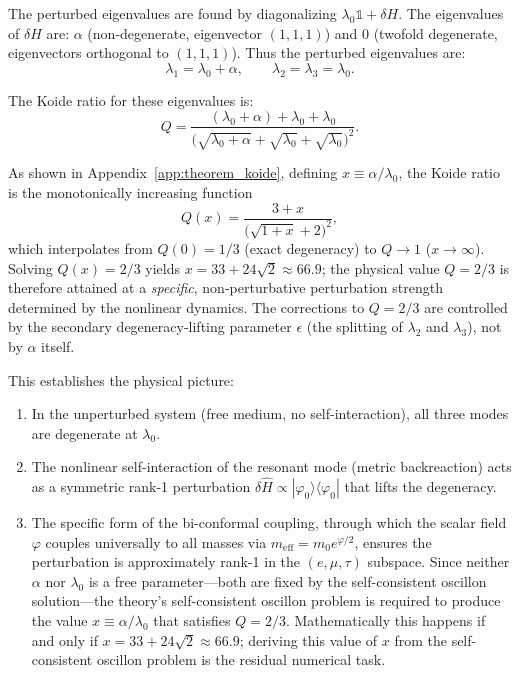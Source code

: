 \documentclass[aps,prd,onecolumn,superscriptaddress,nofootinbib,showpacs,12pt,notitlepage]{revtex4-2}
\newcommand{\meff}{m_{\mathrm{eff}}}
\begin{document}
The perturbed eigenvalues are found by diagonalizing
$\lambda_0 \mathbb{1} + \delta H$.  The eigenvalues of $\delta H$
are: $\alpha$ (non-degenerate, eigenvector $(1,1,1)$) and $0$
(twofold degenerate, eigenvectors orthogonal to $(1,1,1)$).  Thus
the perturbed eigenvalues are:
\begin{equation}
  \lambda_1 = \lambda_0 + \alpha, \qquad
  \lambda_2 = \lambda_3 = \lambda_0.
\end{equation}

The Koide ratio for these eigenvalues is:
\begin{equation}
  Q = \frac{(\lambda_0 + \alpha) + \lambda_0 + \lambda_0}
    {\bigl(\sqrt{\lambda_0 + \alpha} + \sqrt{\lambda_0} + \sqrt{\lambda_0}\bigr)^2}.
\end{equation}

As shown in Appendix~\ref{app:theorem_koide}, defining
$x \equiv \alpha/\lambda_0$, the Koide ratio is the
monotonically increasing function
\begin{equation}
  Q(x) = \frac{3 + x}
    {\bigl(\sqrt{1+x} + 2\bigr)^2},
\end{equation}
which interpolates from $Q(0) = 1/3$ (exact degeneracy) to
$Q \to 1$ ($x \to \infty$).  Solving $Q(x) = 2/3$ yields
$x = 33 + 24\sqrt{2} \approx 66.9$; the physical value
$Q = 2/3$ is therefore attained at a \emph{specific},
non-perturbative perturbation strength determined by
the nonlinear dynamics.  The corrections to $Q = 2/3$ are
controlled by the secondary degeneracy-lifting parameter
$\epsilon$ (the splitting of $\lambda_2$ and $\lambda_3$),
not by $\alpha$ itself.

This establishes the physical picture:
\begin{enumerate}
  \item In the unperturbed system (free medium, no
    self-interaction), all three modes are degenerate at $\lambda_0$.
  \item The nonlinear self-interaction of the resonant
    mode (metric backreaction) acts as a symmetric rank-1 perturbation
    $\delta\hat{H} \propto |\varphi_0\rangle\langle\varphi_0|$ that
    lifts the degeneracy.
  \item The specific form of the bi-conformal coupling,
    through which the scalar field $\varphi$ couples universally
    to all masses via $\meff = m_0 e^{\varphi/2}$, ensures the
    perturbation is approximately rank-1 in the $(e, \mu, \tau)$
    subspace.  Since neither $\alpha$ nor $\lambda_0$ is a free
    parameter---both are fixed by the self-consistent oscillon
    solution---the theory's self-consistent oscillon problem
    is required to produce the value
    $x \equiv \alpha/\lambda_0$ that satisfies $Q = 2/3$.
    Mathematically this happens if and only if
    $x = 33 + 24\sqrt{2} \approx 66.9$; deriving this
    value of $x$ from the self-consistent oscillon problem
    is the residual numerical task.
\end{enumerate}
\end{document}
